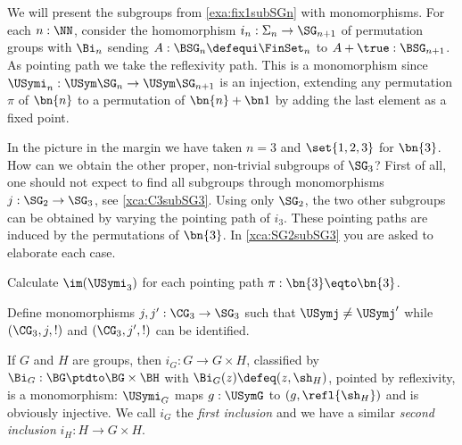 \begin{example}
  \label{ex:SGninSGn+1}
We will present the subgroups from \cref{exa:fix1subSGn} with
monomorphisms. For each $n:\NN$, consider the  homomorphism 
$i_n:\Sigma_n\to\SG_{n+1}$ of permutation groups
with $\Bi_n$ sending $A:\BSG_n\defequi \FinSet_n$ to $A+\true:\BSG_{n+1}$.
As pointing path we take the reflexivity path.
This is a monomorphism since $\USymi_n:\USym\SG_n\to\USym\SG_{n+1}$ 
is an injection, extending any permutation $\pi$ of $\bn{n}$ to 
a permutation of $\bn{n}+\bn1$ by adding the last element as a
fixed point.

In the picture in the margin we have taken $n=3$ and
$\set{1,2,3}$ for $\bn{3}$. How can we obtain the other proper,
non-trivial subgroups of $\SG_3$? First of all, one should not
expect to find all subgroups through monomorphisms $j:\SG_2\to\SG_3$,
see \cref{xca:C3subSG3}. Using only $\SG_2$, the
two other subgroups can be obtained by varying the pointing
path of $i_3$. These pointing paths are induced by the permutations 
of $\bn{3}$. In \cref{xca:SG2subSG3} you are asked to elaborate each case.
\end{example}

\begin{xca}\label{xca:SG2subSG3}
Calculate $\im(\USymi_3)$ for each pointing path $\pi:\bn{3}\eqto\bn{3}$.
\end{xca}

\begin{xca}\label{xca:C3subSG3}
Define monomorphisms $j,j':\CG_3\to\SG_3$ such that $\USymj\neq \USymj'$
while $(\CG_3,j,!)$ and $(\CG_3,j',!)$ can be identified.
\end{xca}

\begin{example}
  \label{ex:prodinclismono}
  If $G$ and $H$ are groups, then $i_G : G \to G\times H$,
  classified by $\Bi_G : \BG \ptdto \BG\times\BH$ with
  $\Bi_G(z) \defeq (z,\sh_H)$, pointed by reflexivity, is a monomorphism:
  $\USymi_G$ maps $g:\USymG$ to $(g,\refl{\sh_H})$ and is obviously injective.
  We call $i_G$ the \emph{first inclusion} and we have a similar
  \emph{second inclusion} $i_H : H \to G\times H$.
\end{example}

